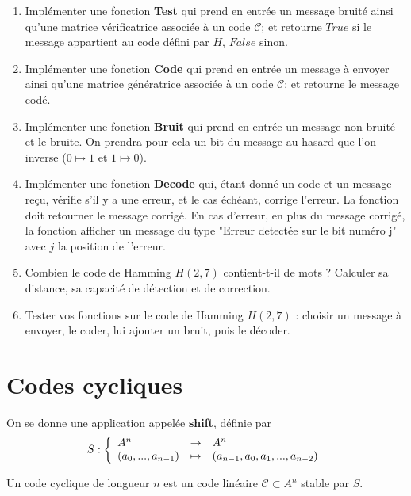 \begin{enumerate}
\item Implémenter une fonction \textbf{Test} qui prend en entrée un message bruité ainsi qu'une matrice vérificatrice associée à un code $\mathcal C$; et retourne $True$ si le message appartient au code défini par $H$, $False$ sinon.
\item Implémenter une fonction \textbf{Code} qui prend en entrée un message à envoyer ainsi qu'une matrice génératrice associée à un code $\mathcal C$; et retourne le message codé.
\item Implémenter une fonction \textbf{Bruit} qui prend en entrée un message non bruité et le bruite. On prendra pour cela un bit du message au hasard que l'on inverse ($0\mapsto 1$ et $1\mapsto 0$).
\item Implémenter une fonction \textbf{Decode} qui, étant donné un code et un message reçu, vérifie s'il y a une erreur, et le cas échéant, corrige l'erreur. La fonction doit retourner le message corrigé. En cas d'erreur, en plus du message corrigé, la fonction afficher un message du type "Erreur detectée sur le bit numéro j" avec $j$ la position de l'erreur.
\item Combien le code de Hamming $H(2,7)$ contient-t-il de mots ? Calculer sa distance, sa capacité de détection et de correction.
\item Tester vos fonctions sur le code de Hamming $H(2,7)$ : choisir un message à envoyer, le coder, lui ajouter un bruit, puis le décoder.
\end{enumerate}

\section{Codes cycliques}

On se donne une application appelée \textbf{shift}, définie par 
\[S :\left\{\begin{array}{lcl}\mathcal  \mathcal A^n &\rightarrow & A^n\\
	(a_0,...,a_{n-1}) & \mapsto & (a_{n-1},a_0, a_1,..., a_{n-2})\end{array}\right.\]
\begin{definition}
Un code cyclique de longueur $n$ est un code linéaire $\mathcal C \subset A^n$ stable par $S$.
\end{definition}


